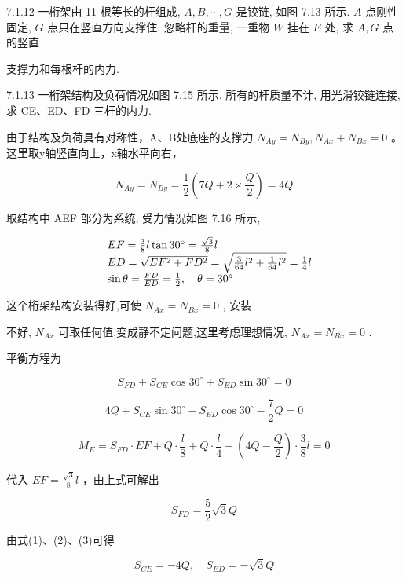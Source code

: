 \begin{problem}{7.1.12}
一桁架由 11 根等长的杆组成, $A, B, \cdots, G$ 是铰链, 如图 7.13 所示. $A$ 点刚性固定, $G$ 点只在竖直方向支撑住, 忽略杆的重量, 一重物 $W$ 挂在 $E$ 处, 求 $A, G$ 点的竖直

支撑力和每根杆的内力.
\begin{center}

\end{center}
\end{problem}
\clearpage


\begin{problem}{7.1.13}
一桁架结构及负荷情况如图 7.15 所示, 所有的杆质量不计, 用光滑铰链连接, 求 CE、ED、FD 三杆的内力.

由于结构及负荷具有对称性，A、B处底座的支撑力 $N_{Ay}=N_{By}, N_{Ax}+N_{Bx}=0$ 。这里取y轴竖直向上，x轴水平向右，

\[
N _ {A y} = N _ {B y} = \frac {1}{2} \left(7 Q + 2 \times \frac {Q}{2}\right) = 4 Q
\]

取结构中 AEF 部分为系统, 受力情况如图 7.16 所示,

\[
\begin{array}{r l} & E F = \frac {3}{8} l \tan 3 0 ^ {\circ} = \frac {\sqrt {3}}{8} l \\ & E D = \sqrt {E F ^ {2} + F D ^ {2}} = \sqrt {\frac {3}{6 4} l ^ {2} + \frac {1}{6 4} l ^ {2}} = \frac {1}{4} l \\ & \sin \theta = \frac {F D}{E D} = \frac {1}{2}, \quad \theta = 3 0 ^ {\circ} \end{array}
\]

这个桁架结构安装得好,可使 $N_{Ax}=N_{Bx}=0$ , 安装

不好, $N_{Ax}$ 可取任何值,变成静不定问题,这里考虑理想情况, $N_{Ax}=N_{Bx}=0$ .

平衡方程为

\[
S _ {F D} + S _ {C E} \cos 3 0 ^ {\circ} + S _ {E D} \sin 3 0 ^ {\circ} = 0\tag{1}
\]

\[
4 Q + S _ {C E} \sin 3 0 ^ {\circ} - S _ {E D} \cos 3 0 ^ {\circ} - \frac {7}{2} Q = 0\tag{2}
\]

\[
M _ {E} = S _ {F D} \cdot E F + Q \cdot \frac {l}{8} + Q \cdot \frac {l}{4} - \left(4 Q - \frac {Q}{2}\right) \cdot \frac {3}{8} l = 0
\]

代入 $EF = \frac{\sqrt{3}}{8} l$ ，由上式可解出

\[
S _ {F D} = \frac {5}{2} \sqrt {3} Q\tag{3}
\]

由式(1)、(2)、(3)可得

\[
S _ {C E} = - 4 Q, \quad S _ {E D} = - \sqrt {3} Q
\]


\end{problem}
